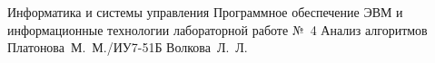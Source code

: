 
\makereporttitle
    {Информатика и системы управления}
    {Программное обеспечение ЭВМ и информационные технологии}
    {лабораторной работе №~4}
    {Анализ алгоритмов}
    {}
    {}
    {Платонова~М.~М./ИУ7-51Б}
    {Волкова~Л.~Л.}
